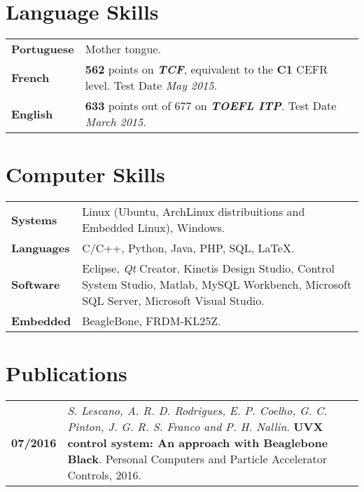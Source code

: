 \documentclass[10pt, a4paper]{article}
\begin{document}


\section{Language Skills}

\begin{tabular}{p{} p{}}

\textbf{Portuguese} & Mother tongue.  \\ 

\textbf{French} & \textbf{562} points on \textbf{\textit{TCF}},
equivalent to the \textbf{C1} CEFR level. Test Date \textit{May 2015}.
\\

\textbf{English} & \textbf{633} points out of 677 on \textbf{\textit{TOEFL
ITP}}. Test Date \textit{March 2015}.
\\

\end{tabular}


\section{Computer Skills}

\begin{tabular}{p{} p{}}

 \textbf{Systems} & Linux (Ubuntu, ArchLinux distribuitions and Embedded Linux),
 Windows.
 \\

 \textbf{Languages} & C/C++, Python, Java, PHP, SQL, \LaTeX.
 \\
 
 \textbf{Software} & Eclipse, \textit{Qt} Creator, Kinetis Design Studio,
 Control System Studio, Matlab, MySQL Workbench, Microsoft SQL Server, Microsoft
 Visual Studio.\\
 
  \textbf{Embedded} & BeagleBone, FRDM-KL25Z. \\
\end{tabular}


\section{Publications}

\begin{tabular}{p{} p{}}

\textbf{07/2016}  & \textit{S. Lescano, A. R. D. Rodrigues, E. P.
Coelho, G. C. Pinton, J. G. R. S. Franco and P. H. Nallin}. \textbf{UVX
control system: An approach with Beaglebone Black}. Personal Computers and
Particle Accelerator Controls, 2016. \\

\end{tabular}
\end{document}
